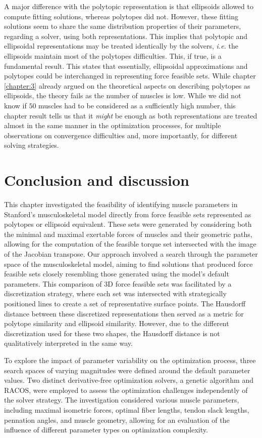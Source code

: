 A major difference with the polytopic representation is that ellipsoids allowed to compute fitting solutions, whereas polytopes did not. However, these fitting solutions seem to share the same distribution properties of their parameters, regarding a solver, using both representations. This implies that polytopic and ellipsoidal representations may be treated identically by the solvers, \emph{i.e.} the ellipsoids maintain most of the polytopes difficulties. This, if true, is a fundamental result. This states that essentially, ellipsoidal approximations and polytopes could be interchanged in representing force feasible sets. While chapter \ref{chapter:3} already argued on the theoretical aspects on describing polytopes as ellipsoids, the theory fails as the number of muscles is low. While we did not know if $50$ muscles had to be considered as a sufficiently high number, this chapter result tells us that it \emph{might} be enough as both representations are treated almost in the same manner in the optimization processes, for multiple observations on convergence difficulties and, more importantly, for different solving strategies.


\section{Conclusion and discussion}
\label{sec:chapter_4_conclusion}
This chapter investigated the feasibility of identifying muscle parameters in Stanford's musculoskeletal model directly from force feasible sets represented as polytopes or ellipsoid equivalent. These sets were generated by considering both the minimal and maximal exertable forces of muscles and their geometric paths, allowing for the computation of the feasible torque set intersected with the image of the Jacobian transpose. Our approach involved a search through the parameter space of the musculoskeletal model, aiming to find solutions that produced force feasible sets closely resembling those generated using the model's default parameters. This comparison of 3D force feasible sets was facilitated by a discretization strategy, where each set was intersected with strategically positioned lines to create a set of representative surface points. The Hausdorff distance between these discretized representations then served as a metric for polytope similarity and ellipsoid similarity. However, due to the different discretization used for these two shapes, the Hausdorff distance is not qualitatively interpreted in the same way.

To explore the impact of parameter variability on the optimization process, three search spaces of varying magnitudes were defined around the default parameter values. Two distinct derivative-free optimization solvers, a genetic algorithm and RACOS, were employed to assess the optimization challenges independently of the solver strategy. The investigation considered various muscle parameters, including maximal isometric forces, optimal fiber lengths, tendon slack lengths, pennation angles, and muscle geometry, allowing for an evaluation of the influence of different parameter types on optimization complexity.

